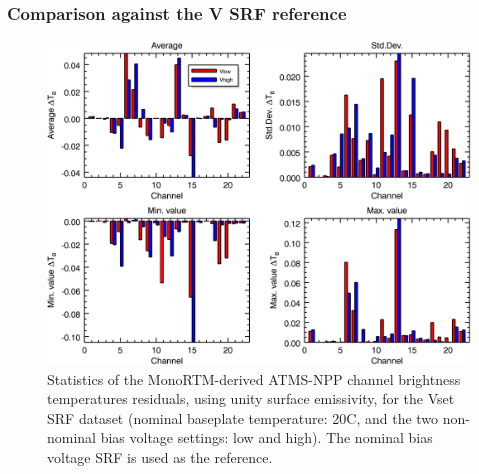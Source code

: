 \subsubsection{Comparison against the V SRF reference}
\begin{figure}[H]
  \centering
    \includegraphics[bb=0 0 416 333,clip,scale=0.9]{graphics/dtb/Vset/e1.0_r0.0/stats_ref-nominal.png} 
  \caption{Statistics of the MonoRTM-derived ATMS-NPP channel brightness temperatures residuals, using unity surface emissivity, for the Vset SRF dataset (nominal baseplate temperature: 20\textdegree{}C, and the two non-nominal bias voltage settings: low and high). The nominal bias voltage SRF is used as the reference.}
  \label{fig:Vset_e1.0_r0.0_stats_ref-nominal}
\end{figure}

